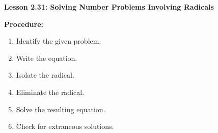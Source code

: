 \begin{center}
\textbf{Lesson 2.31: Solving Number Problems Involving Radicals}
\end{center}

\vspace*{-1.5ex}

\noindent \textbf{Procedure:}
\begin{enumerate}[noitemsep, label = \color{blue}\arabic*. ]
    \item Identify the given problem. 
    \item Write the equation.
    \item Isolate the radical.
    \item Eliminate the radical.
    \item Solve the resulting equation.
    \item Check for extraneous solutions.
\end{enumerate}

